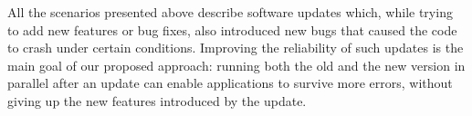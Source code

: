 All the scenarios presented above describe software updates which,
while trying to add new features or bug fixes, also introduced new
bugs that caused the code to crash under certain conditions.
Improving the reliability of such updates is the main goal of our
proposed approach: running both the old and the new version in
parallel after an update can enable applications to survive more
errors, without giving up the new features introduced by the update.

%

%

%


  

